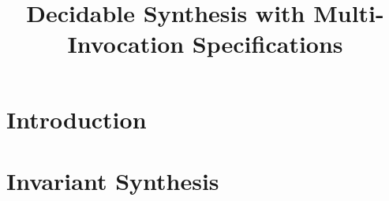 \documentclass[runningheads]{llncs}
\begin{document}
\mainmatter  %

\title{Decidable Synthesis with Multi-Invocation Specifications}


%
%
%


%
%

\maketitle


\begin{abstract}

\end{abstract}



\section{Introduction}
\label{sec:intro}


\section{Invariant Synthesis}
\label{sec:invariant}
\end{document}
